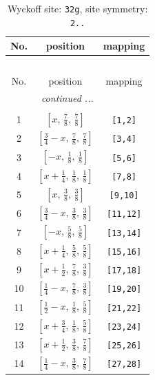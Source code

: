 \documentclass[fleqn,8pt]{jsarticle}
\begin{document}
\begin{longtable}{ccc}
\caption{Wyckoff site: {\tt 32g}, site symmetry: {\tt 2..}}
 \\
 \hline \hline
No. & position & mapping \\ \hline \endfirsthead

\multicolumn{2}{l}{\tablename\ \thetable{}} \\
 \hline \hline
No. & position & mapping \\ \hline \endhead

 \hline \hline
\multicolumn{2}{r}{\footnotesize\it continued ...} \\ \endfoot

 \hline \hline
\multicolumn{2}{r}{} \\ \endlastfoot

1 & $\left[ x,\, \frac{7}{8},\, \frac{7}{8} \right]$ & {\tt [1,2]} \\ \hline
2 & $\left[ \frac{3}{4} - x,\, \frac{7}{8},\, \frac{7}{8} \right]$ & {\tt [3,4]} \\ \hline
3 & $\left[ - x,\, \frac{1}{8},\, \frac{1}{8} \right]$ & {\tt [5,6]} \\ \hline
4 & $\left[ x + \frac{1}{4},\, \frac{1}{8},\, \frac{1}{8} \right]$ & {\tt [7,8]} \\ \hline
5 & $\left[ x,\, \frac{3}{8},\, \frac{3}{8} \right]$ & {\tt [9,10]} \\ \hline
6 & $\left[ \frac{3}{4} - x,\, \frac{3}{8},\, \frac{3}{8} \right]$ & {\tt [11,12]} \\ \hline
7 & $\left[ - x,\, \frac{5}{8},\, \frac{5}{8} \right]$ & {\tt [13,14]} \\ \hline
8 & $\left[ x + \frac{1}{4},\, \frac{5}{8},\, \frac{5}{8} \right]$ & {\tt [15,16]} \\ \hline
9 & $\left[ x + \frac{1}{2},\, \frac{7}{8},\, \frac{3}{8} \right]$ & {\tt [17,18]} \\ \hline
10 & $\left[ \frac{1}{4} - x,\, \frac{7}{8},\, \frac{3}{8} \right]$ & {\tt [19,20]} \\ \hline
11 & $\left[ \frac{1}{2} - x,\, \frac{1}{8},\, \frac{5}{8} \right]$ & {\tt [21,22]} \\ \hline
12 & $\left[ x + \frac{3}{4},\, \frac{1}{8},\, \frac{5}{8} \right]$ & {\tt [23,24]} \\ \hline
13 & $\left[ x + \frac{1}{2},\, \frac{3}{8},\, \frac{7}{8} \right]$ & {\tt [25,26]} \\ \hline
14 & $\left[ \frac{1}{4} - x,\, \frac{3}{8},\, \frac{7}{8} \right]$ & {\tt [27,28]} \\ \hline

\end{longtable}
\end{document}
